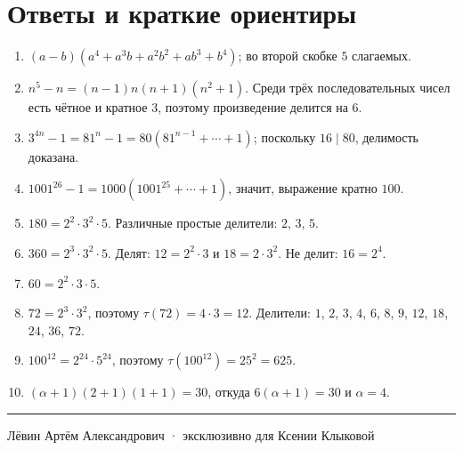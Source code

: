 \documentclass[a4paper,12pt]{article}
\newcommand{\sectiontitle}[1]{\needspace{5\baselineskip}\section*{\color{deepaccent}#1}}
\begin{document}
\sectiontitle{Ответы и краткие ориентиры}
\begin{enumerate}[label=\textbf{\arabic*.},leftmargin=10mm,itemsep=9pt]
\item $(a-b)(a^4+a^3b+a^2b^2+ab^3+b^4)$; во второй скобке $5$ слагаемых.
\item $n^5-n=(n-1)n(n+1)(n^2+1)$. Среди трёх последовательных чисел есть чётное и кратное $3$, поэтому произведение делится на $6$.
\item $3^{4n}-1=81^n-1=80(81^{n-1}+\cdots+1)$; поскольку $16\mid80$, делимость доказана.
\item $1001^{26}-1=1000(1001^{25}+\cdots+1)$, значит, выражение кратно $100$.
\item $180=2^2\cdot3^2\cdot5$. Различные простые делители: $2$, $3$, $5$.
\item $360=2^3\cdot3^2\cdot5$. Делят: $12=2^2\cdot3$ и $18=2\cdot3^2$. Не делит: $16=2^4$.
\item $\boxed{60=2^2\cdot3\cdot5}$.
\item $72=2^3\cdot3^2$, поэтому $\tau(72)=4\cdot3=\boxed{12}$. Делители: $1$, $2$, $3$, $4$, $6$, $8$, $9$, $12$, $18$, $24$, $36$, $72$.
\item $100^{12}=2^{24}\cdot5^{24}$, поэтому $\tau(100^{12})=25^2=\boxed{625}$.
\item $(\alpha+1)(2+1)(1+1)=30$, откуда $6(\alpha+1)=30$ и $\boxed{\alpha=4}$.
\end{enumerate}
\vfill
\noindent\textcolor{accent}{\rule{\linewidth}{0.35pt}}
\begin{center}
\small\color{textgray} Лёвин Артём Александрович · эксклюзивно для Ксении Клыковой
\end{center}
\end{document}
